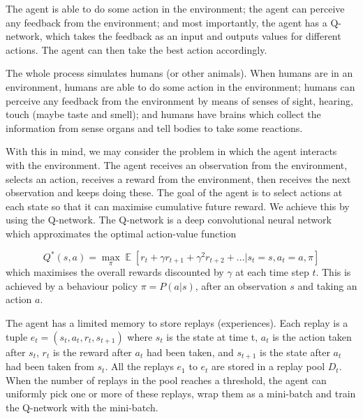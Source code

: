 \documentclass[a4paper]{article}
\DeclareMathOperator{\E}{\mathbb{E}}
\begin{document}
            The agent is able to do some action in the environment; the agent can perceive any
            feedback from the environment; and most importantly, the agent has a Q-network,
            which takes the feedback as an input and outputs values for different actions.
            The agent can then take the best action accordingly. 
            
            The whole process simulates humans (or other animals). When humans are in an
            environment, humans are able to do some action in the environment; humans can perceive any feedback from the environment by means of senses of sight, hearing, touch (maybe taste and smell); and humans have brains which collect the information from sense organs and tell bodies to take some reactions.
            
            With this in mind, we may consider the problem in which the agent interacts with the environment. The agent receives an observation from the environment, selects an action, receives a reward from the environment, then receives the next observation and keeps doing these. The goal of the agent is to select actions at each state so that it can maximise cumulative future reward. \cite{human-level} We achieve this by using the Q-network. The Q-network is a deep convolutional neural network which approximates the optimal action-value function
            
            \begin{equation*}
                Q^*(s,a) = \max_\pi \E[r_t+\gamma r_{t+1}+ \gamma^2 r_{t+2}+...|s_t=s, a_t=a, \pi]
            \end{equation*}
            which maximises the overall rewards discounted by $\gamma$ at each time step $t$. This is achieved by a behaviour policy $\pi = P(a|s)$, after an observation $s$ and taking an action $a$.\cite{human-level}
            
            The agent has a limited memory to store replays (experiences). Each replay is a tuple $e_t = (s_{t}, a_t, r_t, s_{t+1})$ where $s_{t}$ is the state at time t, $a_t$ is the action taken after $s_t$, $r_t$ is the reward after $a_t$ had been taken, and $s_{t+1}$ is the state after $a_t$ had been taken from $s_t$. All the replays $e_1$ to $e_t$ are stored in a replay pool $D_t$.  When the number of replays in the pool reaches a threshold, the agent can uniformly pick one or more of these replays, wrap them as a mini-batch and train the Q-network with the mini-batch. 
            
\end{document}
